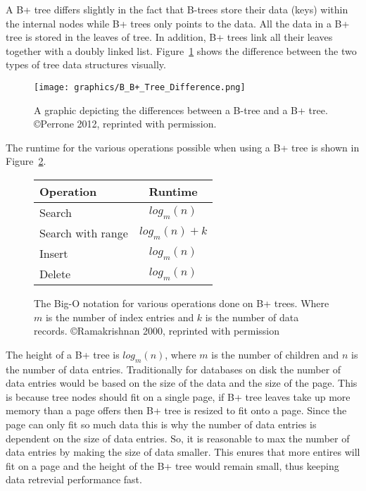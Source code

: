 \documentclass[letterpaper, 11pt]{article}
\begin{document}
A B+ tree differs slightly in the fact that B-trees store their data (keys) within the internal nodes while 
B+ trees only points to the data. All the data in a B+ tree is stored in the leaves of tree. In addition,
B+ trees link all their leaves together with a doubly linked list. Figure~\ref{fig:b_b+_tree_diff} shows
the difference between the two types of tree data structures visually.
\par\vspace{\baselineskip}

\begin{figure}[H]
  \centering
  \texttt{[image: graphics/B\_B+\_Tree\_Difference.png]}
  \caption{A graphic depicting the differences between a B-tree and a B+ tree. \copyright Perrone 2012, reprinted with permission.\cite{b+tree}}
  \label{fig:b_b+_tree_diff}
\end{figure}

The runtime for the various operations possible when using a B+ tree is shown
in Figure~\ref{fig:b+_tree_runtimes}.

\begin{figure}[H]
  \centering
  \begin{tabular}{l | c}
    Operation & Runtime \\ \hline \hline
    Search & $log_m(n)$ \\ \hline
    Search with range & $log_m(n) + k$ \\ \hline
    Insert & $log_m(n)$ \\ \hline
    Delete & $log_m(n)$ \\ \hline
  \end{tabular}
  \caption{The Big-O notation for various operations done on B+ trees. Where $m$ is the 
	   number of index entries and $k$ is the number of data records. \copyright Ramakrishnan 2000, reprinted with permission}
  \label{fig:b+_tree_runtimes}
\end{figure}

The height of a B+ tree is $log_m(n)$, where $m$ is the number of children and $n$ is the number of data entries.
Traditionally for databases on disk the number of data entries would be based on the size of the data and
the size of the page. This is because tree nodes should fit on a single page, if B+ tree leaves take up more
memory than a page offers then B+ tree is resized to fit onto a page. Since the page can only fit so much
data this is why the number of data entries is dependent on the size of data entries. So, it is reasonable
to max the number of data entries by making the size of data smaller. This enures that more entires will
fit on a page and the height of the B+ tree would remain small, thus keeping data retrevial performance fast.
\par\vspace{\baselineskip}
\end{document}
